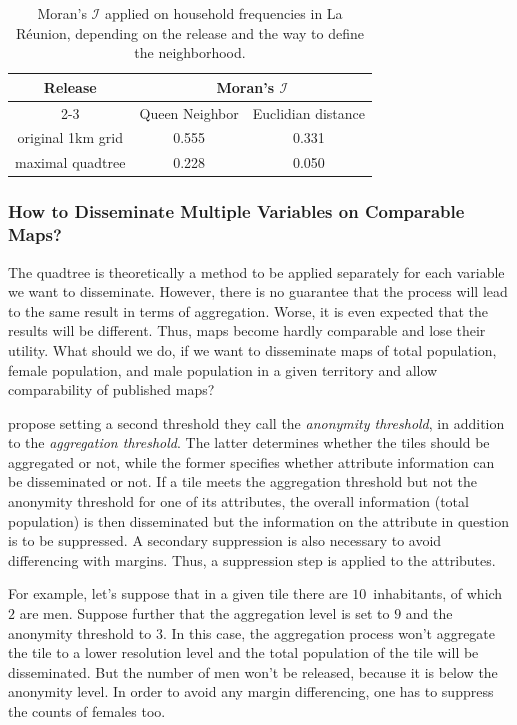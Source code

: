 \begin{table}
    \centering
    \begin{tabular}{ccc}
        \toprule
        \multirow{2}{*}{Release} & \multicolumn{2}{c}{Moran's $\mathcal{I}$} \\
        \cmidrule{2-3}
                                 & Queen Neighbor & Euclidian distance\\
        \midrule
        original 1km grid        & 0.555          & 0.331 \\
        maximal quadtree         & 0.228          & 0.050 \\
        \bottomrule
    \end{tabular}
    \caption{Moran's $\mathcal{I}$ applied on household frequencies in La Réunion, depending on the release and the way to define the neighborhood.}
    \label{tab:MoranI_reunion}
\end{table}

\subsubsection{How to Disseminate Multiple Variables on Comparable Maps?}

The quadtree is theoretically a method to be applied separately for each variable we want to disseminate. However, there is no guarantee that the process will lead to the same result in terms of aggregation. Worse, it is even expected that the results will be different. Thus, maps become hardly comparable and lose their utility. What should we do, if we want to disseminate maps of total population, female population, and male population in a given territory and allow comparability of published maps?

\cite{Lagonigro_Oller_Martori_2017} propose setting a second threshold they call the \emph{anonymity threshold}, in addition to the \emph{aggregation threshold}. The latter determines whether the tiles should be aggregated or not, while the former specifies whether attribute information can be disseminated or not. If a tile meets the aggregation threshold but not the anonymity threshold for one of its attributes, the overall information (total population) is then disseminated but the information on the attribute in question is to be suppressed. A secondary suppression is also necessary to avoid differencing with margins. Thus, a suppression step is applied to the attributes.

For example, let's suppose that in a given tile there are $10$~inhabitants, of which $2$ are men. Suppose further that the aggregation level is set to $9$ and the anonymity threshold to $3$. In this case, the aggregation process won't aggregate the tile to a lower resolution level and the total population of the tile will be disseminated. But the number of men won't be released, because it is below the anonymity level. In order to avoid any margin differencing, one has to suppress the counts of females too.

